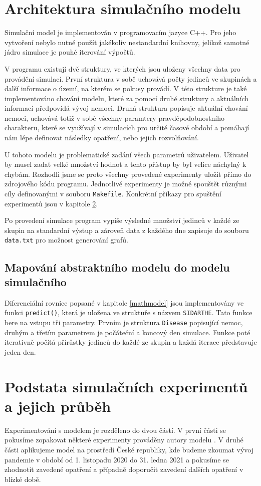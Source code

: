 \documentclass[a4paper,11pt]{article}
\begin{document}
	\section{Architektura simulačního modelu}
		Simulační model je implementován v programovacím jazyce C++. Pro jeho vytvoření nebylo nutné použít jakékoliv nestandardní knihovny, jelikož samotné jádro simulace je pouhé iterování výpočtů.
		
		V programu existují dvě struktury, ve kterých jsou uloženy všechny data pro provádění simulací. První struktura v sobě uchovává počty jedinců ve skupinách a další informace o území, na kterém se pokusy provádí. V této strukture je také implementováno chování modelu, které za pomocí druhé struktury a aktuálních informací předpovídá vývoj nemoci. Druhá struktura popisuje aktuální chování nemoci, uchovává totiž v sobě všechny paramtery pravděpodobnostního charakteru, které se využívají v simulacích pro určité časové období a pomáhají nám lépe definovat následky opatření, nebo jejich rozvolňování.
		
		U tohoto modelu je problematické zadání všech parametrů uživatelem. Uživatel by musel zadat velké množství hodnot a tento přístup by byl velice náchylný k chybám. Rozhodli jsme se proto všechny provedené experimenty uložit přímo do zdrojového kódu programu. Jednotlivé experimenty je možné spouštět různými cíly definovanými v souboru \texttt{Makefile}. Konkrétní příkazy pro spuštění experimentů jsou v kapitole \ref{experiments}.
		
		Po provedení simulace program vypíše výsledné množství jedinců v každé ze skupin na standardní výstup a zároveň data z každého dne zapisuje do souboru \texttt{data.txt} pro možnost generování grafů.
		
		\subsection{Mapování abstraktního modelu do modelu simulačního}
			Diferenciální rovnice popsané v kapitole \ref{mathmodel} jsou implementovány ve funkci \texttt{predict()}, která je uložena ve struktuře s názvem \texttt{SIDARTHE}. Tato funkce bere na vstupu tři parametry. Prvním je struktura \texttt{Disease} popisující nemoc, druhým a třetím parametrem je počáteční a koncový den simulace. Funkce poté iterativně počítá přírůstky jedinců do každé ze skupin a každá iterace představuje jeden den.
			
	\section{Podstata simulačních experimentů a jejich průběh}
	\label{experiments}
		Experimentování s modelem je rozděleno do dvou částí. V první části se pokusíme zopakovat některé experimenty prováděny autory modelu \cite{source}. V druhé části aplikujeme model na prostředí České republiky, kde budeme zkoumat vývoj pandemie v období od 1. listopadu 2020 do 31. ledna 2021 a pokusíme se zhodnotit zavedené opatření a případně doporučit zavedení dalších opatření v blízké době.
		
\end{document}
